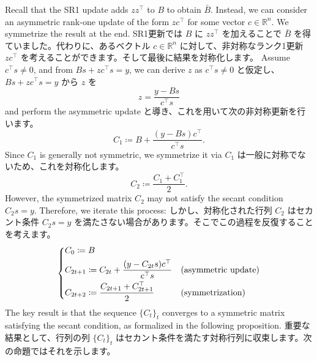 \documentclass[0_main]{subfiles}
\begin{document}
\ifEn
    Recall that the SR1 update adds $z z^\top$ to $B$ to obtain $\bar{B}$. Instead, we can consider an asymmetric rank-one update of the form $z c^\top$ for some vector $c \in \mathbb{R}^n$. We symmetrize the result at the end.
\else
    SR1更新では $B$ に $z z^\top$ を加えることで $\bar{B}$ を得ていました。代わりに、あるベクトル $c \in \mathbb{R}^n$ に対して、非対称なランク1更新 $z c^\top$ を考えることができます。そして最後に結果を対称化します。
\fi
\ifEn
    Assume $c^\top s \neq 0$, and from $Bs + z c^\top s = y$, we can derive $z$ as
\else
    $c^\top s \neq 0$ と仮定し、$Bs + z c^\top s = y$ から $z$ を
\fi
\begin{equation*}
    z = \frac{y - B s}{c^\top s}
\end{equation*}
\ifEn
    and perform the asymmetric update
\else
    と導き、これを用いて次の非対称更新を行います。
\fi
\begin{equation*}
    C_1 \coloneqq B + \frac{(y - B s)c^\top}{c^\top s}.
\end{equation*}
\ifEn
    Since $C_1$ is generally not symmetric, we symmetrize it via
\else
    $C_1$ は一般に対称でないため、これを対称化します。
\fi
\begin{equation*}
    C_2 \coloneqq \frac{C_1 + C_1^\top}{2}.
\end{equation*}
\ifEn
    However, the symmetrized matrix $C_2$ may not satisfy the secant condition $C_2 s = y$. Therefore, we iterate this process:
\else
    しかし、対称化された行列 $C_2$ はセカント条件 $C_2 s = y$ を満たさない場合があります。そこでこの過程を反復することを考えます。
\fi
\begin{equation*}
    \begin{dcases}
        C_0 \coloneqq B                                                                               \\
        C_{2t+1} \coloneqq C_{2t} + \frac{(y - C_{2t}s)c^\top}{c^\top s} & (\text{asymmetric update}) \\
        C_{2t+2} \coloneqq \frac{C_{2t+1} + C_{2t+1}^\top}{2}            & (\text{symmetrization})
    \end{dcases}
\end{equation*}
\ifEn
    The key result is that the sequence $\{ C_t \}_t$ converges to a symmetric matrix satisfying the secant condition, as formalized in the following proposition.
\else
    重要な結果として、行列の列 $\{ C_t \}_t$ はセカント条件を満たす対称行列に収束します。次の命題ではそれを示します。
\fi
\end{document}
